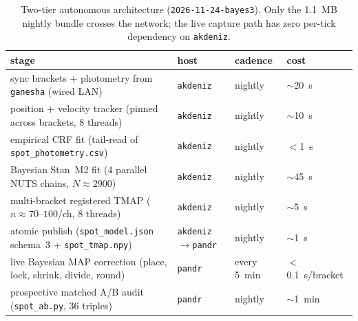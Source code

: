 \documentclass[11pt,a4paper]{article}
\newcommand{\code}[1]{\texttt{\small #1}}
\begin{document}
\begin{table}[ht]
\centering
\footnotesize
\begin{tabular}{@{}p{6.8cm}lll@{}}
\toprule
stage & host & cadence & cost \\
\midrule
sync brackets + photometry from \code{ganesha} (wired LAN) & \code{akdeniz} & nightly & $\sim$\SI{20}{s} \\
position + velocity tracker (pinned across brackets, 8 threads) & \code{akdeniz} & nightly & $\sim$\SI{10}{s} \\
empirical CRF fit (tail-read of \code{spot\_photometry.csv}) & \code{akdeniz} & nightly & $<$\SI{1}{s} \\
Bayesian Stan~M2 fit (4 parallel NUTS chains, $N\approx 2900$) & \code{akdeniz} & nightly & $\sim$\SI{45}{s} \\
multi-bracket registered TMAP ($n\approx 70$--$100$/ch, 8 threads) & \code{akdeniz} & nightly & $\sim$\SI{5}{s} \\
atomic publish (\code{spot\_model.json} schema~3 + \code{spot\_tmap.npy}) & \code{akdeniz}$\to$\code{pandr} & nightly & $\sim$\SI{1}{s} \\
live Bayesian MAP correction (place, lock, shrink, divide, round) & \code{pandr} & every 5~min & $<$\SI{0.1}{s}/bracket \\
prospective matched A/B audit (\code{spot\_ab.py}, 36 triples) & \code{pandr} & nightly & $\sim$\SI{1}{min} \\
\bottomrule
\end{tabular}
\caption{Two-tier autonomous architecture (\code{2026-11-24-bayes3}). Only the
\SI{1.1}{MB} nightly bundle crosses the network; the live capture path has zero
per-tick dependency on \code{akdeniz}.}
\label{tab:levels}
\end{table}
\end{document}
